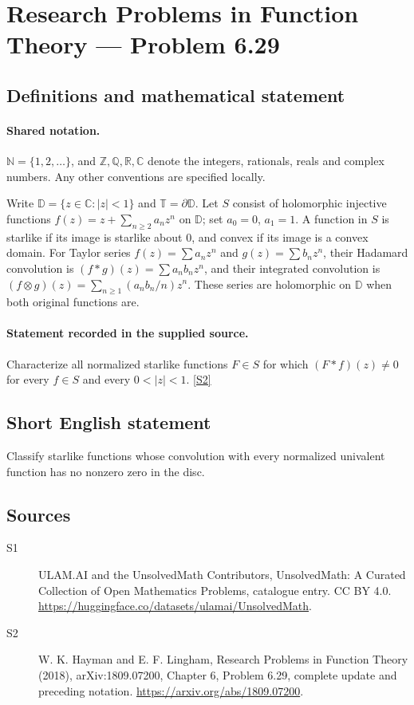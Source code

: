 \documentclass[11pt]{article}
\newcommand{\sref}[2]{\hyperlink{source:#1:#2}{[S#2]}}
\begin{document}
\section{Research Problems in Function Theory — Problem 6.29}\label{statement}

\subsection{Definitions and mathematical statement}

\paragraph{Shared notation.}$\mathbb N=\{1,2,\ldots\}$, and $\mathbb Z,\mathbb Q,\mathbb R,\mathbb C$ denote the integers, rationals, reals and complex numbers. Any other conventions are specified locally.


Write $\mathbb D=\{z\in\mathbb C:|z|<1\}$ and $\mathbb T=\partial\mathbb D$. Let $S$ consist of holomorphic injective functions $f(z)=z+\sum_{n\ge2}a_nz^n$ on $\mathbb D$; set $a_0=0$, $a_1=1$. A function in $S$ is starlike if its image is starlike about $0$, and convex if its image is a convex domain. For Taylor series $f(z)=\sum a_nz^n$ and $g(z)=\sum b_nz^n$, their Hadamard convolution is $(f*g)(z)=\sum a_nb_nz^n$, and their integrated convolution is $(f\otimes g)(z)=\sum_{n\ge1}(a_nb_n/n)z^n$. These series are holomorphic on $\mathbb D$ when both original functions are.
\paragraph{Statement recorded in the supplied source.}
Characterize all normalized starlike functions $F\in S$ for which $(F*f)(z)\ne0$ for every $f\in S$ and every $0<|z|<1$. \sref{statement}{2}
\subsection{Short English statement}
Classify starlike functions whose convolution with every normalized univalent function has no nonzero zero in the disc.
\subsection{Sources}
\begin{description}
\item[\hypertarget{source:statement:1}{S1}] ULAM.AI and the UnsolvedMath Contributors, UnsolvedMath: A Curated Collection of Open Mathematics Problems, catalogue entry. CC BY 4.0. \url{https://huggingface.co/datasets/ulamai/UnsolvedMath}.
\item[\hypertarget{source:statement:2}{S2}] W. K. Hayman and E. F. Lingham, Research Problems in Function Theory (2018), arXiv:1809.07200, Chapter 6, Problem 6.29, complete update and preceding notation. \url{https://arxiv.org/abs/1809.07200}.
\end{description}
\label{end:statement}
\end{document}
